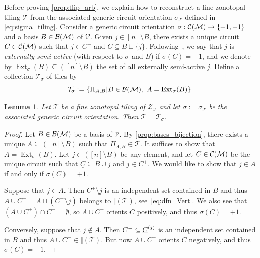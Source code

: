 \documentclass[11pt]{amsart}
\theoremstyle{plain}
\newtheorem{lemma}[theorem]{Lemma}
\theoremstyle{definition}
\def\V{\mathcal{V}}
\def\Zon{\mathcal{Z}}
\def\ZV{\Zon_\V}
\def\VC{\V}
\def\Tcal{\mathcal{T}}
\def\suppC{{\underline{C}}}
\def\Tiling{\Tcal}
\def\tile{\Pi}
\def\eltminus{\setminus}
\let\subset\subseteq
\begin{document}
\def\ESA{\operatorname{Ext}}
\def\ExtB{\ESA_{\sigma}(B)}
\def\ExtXX_#1(#2){\ESA_{#1}(#2)}
Before proving \cref{prop:flip_arb}, we explain how to reconstruct a fine zonotopal tiling $\Tiling$ from the associated generic circuit orientation $\sigma_\Tiling$ defined in 
\eqref{eq:sigma_tiling}.
Consider a generic circuit orientation $\sigma:\mathcal{C}(\mathcal{M})\to \{+1,-1\}$ and a basis $B\in\mathcal{B}(\mathcal{M})$ of $\VC$. Given $j\in[n]\setminus B$, there exists a unique circuit $C\in\mathcal{C}(\mathcal{M})$ such that $j\in C^+$ and $\suppC\subset B\sqcup\{j\}$. Following~\cite{LiPo}, we say that $j$ is \emph{externally semi-active} (with respect to $\sigma$ and $B$) if $\sigma(C)=+1$, and we denote by $\ExtB\subset([n]\setminus B)$ the set of all externally semi-active $j$. Define a collection $\Tiling_\sigma$ of tiles by
\begin{equation}\label{eq:ESA}
\Tiling_\sigma:=\left\{\tile_{A,B} \middle| B\in\Bases,\ A=\ExtB\right\}.
\end{equation}
\begin{lemma}\label{lemma:ESA}
Let $\Tiling$ be a fine zonotopal tiling of $\ZV$ and let $\sigma:=\sigma_\Tiling$ be the associated generic circuit orientation. Then $\Tiling=\Tiling_\sigma$.
\end{lemma}
\begin{proof}
Let $B\in\mathcal{B}(\mathcal{M})$ be a basis of $\VC$. By \cref{prop:bases_bijection}, there exists a unique $A\subset([n]\setminus B)$ such that $\tile_{A,B}\in \Tiling$. It suffices to show that $A=\ExtB$. Let $j\in ([n]\setminus B)$ be any element, and let $C\in\mathcal{C}(\mathcal{M})$ be the unique circuit such that $\suppC\subset B\cup j$ and $j\in C^+$. We would like to show that $j\in A$ if and only if $\sigma(C)=+1$.

Suppose that $j\in A$. Then $C^+\eltminus j$ is an independent set contained in $B$ and thus $A\cup C^+=A\sqcup (C^+\eltminus j)$ belongs to $\Vert(\Tiling)$, see~\eqref{eq:dfn_Vert}. We also see that $(A\cup C^+)\cap C^-=\emptyset$, so  $A\cup C^+$ orients $C$ positively, and thus $\sigma(C)=+1$.

Conversely, suppose that $j\notin A$. Then $C^-\subset \sC^j$ is an independent set contained in $B$ and thus $A\cup C^-\in \Vert(\Tiling)$. But now $A\cup C^-$ orients $C$ negatively, and thus $\sigma(C)=-1$.
\end{proof}
\end{document}
